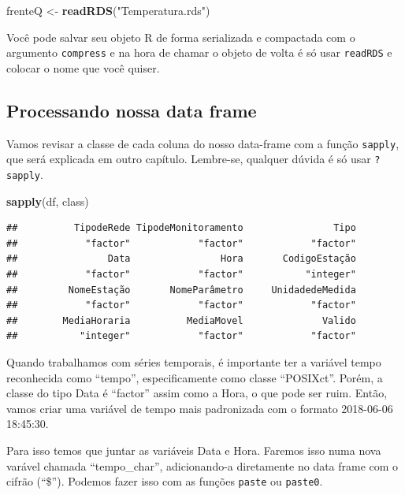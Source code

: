 \documentclass[]{book}
\newenvironment{Shaded}{\begin{snugshade}}{\end{snugshade}}
\newcommand{\KeywordTok}[1]{\textcolor[rgb]{0.13,0.29,0.53}{\textbf{#1}}}
\newcommand{\StringTok}[1]{\textcolor[rgb]{0.31,0.60,0.02}{#1}}
\newcommand{\NormalTok}[1]{#1}
\theoremstyle{definition}
\theoremstyle{definition}
\theoremstyle{definition}
\theoremstyle{remark}
\begin{document}
\begin{Shaded}
\begin{Highlighting}[]
\NormalTok{frenteQ <-}\StringTok{ }\KeywordTok{readRDS}\NormalTok{(}\StringTok{"Temperatura.rds"}\NormalTok{)}
\end{Highlighting}
\end{Shaded}

Você pode salvar seu objeto R de forma serializada e compactada com o
argumento \texttt{compress} e na hora de chamar o objeto de volta é só
usar \texttt{readRDS} e colocar o nome que você quiser.

\hypertarget{processing_dfs}{\subsection{Processando nossa data
frame}\label{processing_dfs}}

Vamos revisar a classe de cada coluna do nosso data-frame com a função
\texttt{sapply}, que será explicada em outro capítulo. Lembre-se,
qualquer dúvida é só usar \texttt{?sapply}.

\begin{Shaded}
\begin{Highlighting}[]
\KeywordTok{sapply}\NormalTok{(df, class)}
\end{Highlighting}
\end{Shaded}

\begin{verbatim}
##          TipodeRede TipodeMonitoramento                Tipo 
##            "factor"            "factor"            "factor" 
##                Data                Hora       CodigoEstação 
##            "factor"            "factor"           "integer" 
##         NomeEstação       NomeParâmetro     UnidadedeMedida 
##            "factor"            "factor"            "factor" 
##        MediaHoraria          MediaMovel              Valido 
##           "integer"            "factor"            "factor"
\end{verbatim}

Quando trabalhamos com séries temporais, é importante ter a variável
tempo reconhecida como ``tempo'', especificamente como classe
``POSIXct''. Porém, a classe do tipo Data é ``factor'' assim como a
Hora, o que pode ser ruim. Então, vamos criar uma variável de tempo mais
padronizada com o formato 2018-06-06 18:45:30.

Para isso temos que juntar as variáveis Data e Hora. Faremos isso numa
nova varável chamada ``tempo\_char'', adicionando-a diretamente no data
frame com o cifrão (``\$''). Podemos fazer isso com as funções
\texttt{paste} ou \texttt{paste0}.
\end{document}
